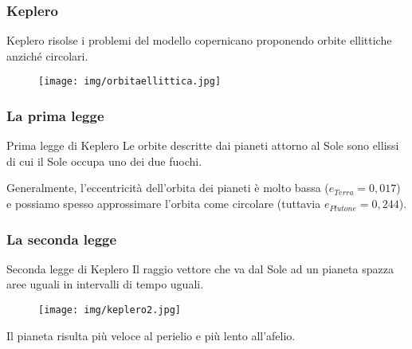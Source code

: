 \documentclass[]{beamer}
\theoremstyle{plain}
\begin{document}
\begin{frame}
\frametitle{Keplero}
Keplero risolse i problemi del modello copernicano proponendo \alert{orbite ellittiche} anziché circolari.
\begin{figure}
\texttt{[image: img/orbitaellittica.jpg]}
\end{figure}

\begin{center}
\href{gif/ellisse.gif}{}
\end{center}
\end{frame}


\begin{frame}
\frametitle{La prima legge}
\begin{block}{Prima legge di Keplero}
Le orbite descritte dai pianeti attorno al Sole sono ellissi di cui il Sole occupa uno dei due fuochi.
\end{block}
\begin{center}
\href{gif/keplero1.gif}{}
\end{center}\pause


Generalmente, l'eccentricità dell'orbita dei pianeti è molto bassa ($ e_{Terra} = 0,017 $) e possiamo spesso approssimare l'orbita come circolare (tuttavia $ e_{Plutone} = 0,244 $).
\end{frame}


\begin{frame}
\frametitle{La seconda legge}
\begin{block}{Seconda legge di Keplero}
Il raggio vettore che va dal Sole ad un pianeta spazza aree uguali in intervalli di tempo uguali.
\end{block}
\begin{figure}
\texttt{[image: img/keplero2.jpg]}

\href{gif/keplero2.gif}{}
\end{figure}\pause
Il pianeta risulta più veloce al perielio e più lento all'afelio.
\end{frame}
\end{document}
